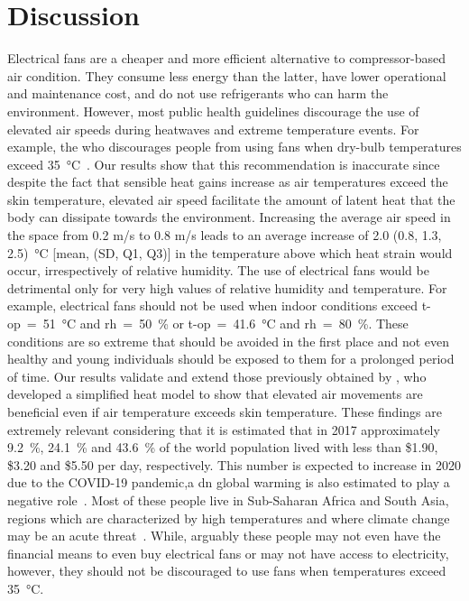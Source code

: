 
\section{Discussion}\label{sec:discussion}

Electrical fans are a cheaper and more efficient alternative to compressor-based air condition.
They consume less energy than the latter, have lower operational and maintenance cost, and do not use refrigerants who can harm the environment.
However, most public health guidelines discourage the use of elevated air speeds during heatwaves and extreme temperature events.
For example, the \ac{who} discourages people from using fans when dry-bulb temperatures exceed 35~°C~\cite{WMO2015}.
Our results show that this recommendation is inaccurate since despite the fact that sensible heat gains increase as air temperatures exceed the skin temperature, elevated air speed facilitate the amount of latent heat that the body can dissipate towards the environment.
Increasing the average air speed in the space from 0.2 m/s to 0.8 m/s leads to an average increase of 2.0 (0.8, 1.3, 2.5)~°C [mean, (SD, Q1, Q3)] in the temperature above which heat strain would occur, irrespectively of relative humidity.
The use of electrical fans would be detrimental only for very high values of relative humidity and temperature.
For example, electrical fans should not be used when indoor conditions exceed \ac{t-op}~=~51~°C and \ac{rh}~=~50~\% or \ac{t-op}~=~41.6~°C and \ac{rh}~=~80~\%.
These conditions are so extreme that should be avoided in the first place and not even healthy and young individuals should be exposed to them for a prolonged period of time.
Our results validate and extend those previously obtained by , who developed a simplified heat model to show that elevated air movements are beneficial even if air temperature exceeds skin temperature.
These findings are extremely relevant considering that it is estimated that in 2017 approximately 9.2~\%, 24.1~\% and 43.6~\% of the world population lived with less than \$1.90, \$3.20 and \$5.50 per day, respectively.
This number is expected to increase in 2020 due to the COVID-19 pandemic,a dn global warming is also estimated to play a negative role~\cite{PovertyO1:online}.
Most of these people live in Sub-Saharan Africa and South Asia, regions which are characterized by high temperatures and where climate change may be an acute threat~\cite{PovertyO1:online}.
While, arguably these people may not even have the financial means to even buy electrical fans or may not have access to electricity, however, they should not be discouraged to use fans when temperatures exceed 35~°C.
